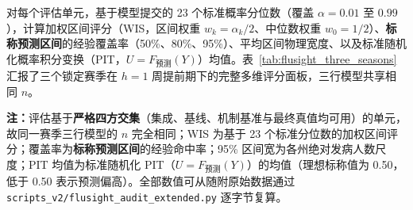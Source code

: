 \documentclass[11pt,a4paper]{article}
\theoremstyle{plain}
\theoremstyle{definition}
\begin{document}
对每个评估单元，基于模型提交的 23 个标准概率分位数（覆盖 $\alpha = 0.01$ 至 $0.99$），计算加权区间评分（WIS\citep{bracher2021evaluating}，区间权重 $w_k = \alpha_k/2$、中位数权重 $w_0 = 1/2$）、\textbf{标称预测区间}的经验覆盖率（50\%、80\%、95\%）、平均区间物理宽度、以及标准随机化概率积分变换（PIT，$U=F_{\text{预测}}(Y)$）均值。表~\ref{tab:flusight_three_seasons} 汇报了三个锁定赛季在 $h=1$ 周提前期下的完整多维评分面板，三行模型共享相同 $n$。

\begin{table}[htbp]
\centering
\small
\caption{CDC FluSight 外部审计评分面板：三个锁定历史赛季（$h=1$ 周）}
\label{tab:flusight_three_seasons}
\resizebox{\textwidth}{!}{%
%
}
\vspace{2pt}
\begin{flushleft}
\scriptsize \textbf{注：}评估基于\textbf{严格四方交集}（集成、基线、机制基准与最终真值均可用）的单元，故同一赛季三行模型的 $n$ 完全相同；WIS 为基于 23 个标准分位数的加权区间评分；覆盖率为\textbf{标称预测区间}的经验命中率；95\% 区间宽为各州绝对发病人数尺度；PIT 均值为标准随机化 PIT（$U=F_{\text{预测}}(Y)$）的均值（理想标称值为 0.50，低于 0.50 表示预测偏高）。全部数值可从随附原始数据通过 \texttt{scripts\_v2/flusight\_audit\_extended.py} 逐字节复算。\end{flushleft}
\end{table}
\end{document}
